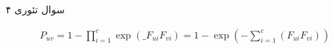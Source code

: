 سوال تئوری ۴

$$
\begin{aligned}P_{uv}=1-\prod ^{c}_{i=1} \exp \left( \_ F_{ui}F_{vi}\right) =1-\exp \left( -\sum ^{c}_{i=1}\left( F_{ui}F_{vi}\right) \right) \end{aligned}
$$
